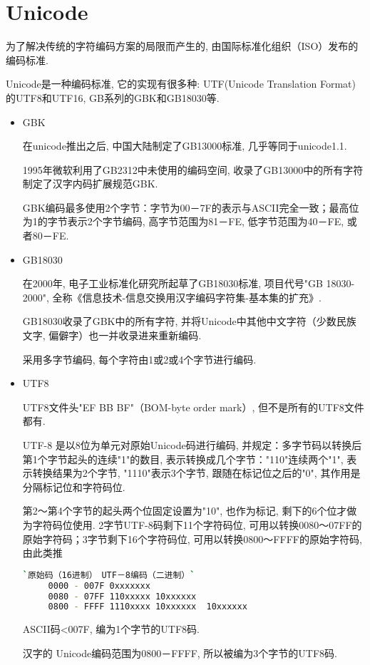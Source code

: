 \section*{\ZHH Unicode}{
    {为了解决传统的字符编码方案的局限而产生的, 由国际标准化组织（ISO）发布的编码标准. }\par
    {Unicode是一种编码标准, 它的实现有很多种: UTF(Unicode Translation Format)的UTF8和UTF16, GB系列的GBK和GB18030等. }\par
    \begin{itemize}
    \item{\ZHH \small GBK}\par{
        {在unicode推出之后, 中国大陆制定了GB13000标准, 几乎等同于unicode1.1.}\par
        {1995年微软利用了GB2312中未使用的编码空间, 收录了GB13000中的所有字符制定了汉字内码扩展规范GBK. }\par
        {GBK编码最多使用2个字节：字节为00－7F的表示与ASCII完全一致；最高位为1的字节表示2个字节编码, 高字节范围为81－FE, 低字节范围为40－FE, 或者80－FE.}\par
    }
    \item{\ZHH \small GB18030}\par{
        {在2000年, 电子工业标准化研究所起草了GB18030标准, 项目代号"GB 18030-2000", 全称《信息技术-信息交换用汉字编码字符集-基本集的扩充》.}\par
        {GB18030收录了GBK中的所有字符, 并将Unicode中其他中文字符（少数民族文字, 偏僻字）也一并收录进来重新编码. }\par
        {采用多字节编码, 每个字符由1或2或4个字节进行编码. }\par
    }
    \item{\ZHH \small UTF8}\par{
        {UTF8文件头"EF BB BF"（BOM-byte order mark）, 但不是所有的UTF8文件都有. }\par
        {UTF-8 是以8位为单元对原始Unicode码进行编码, 并规定：多字节码以转换后第1个字节起头的连续"1"的数目, 表示转换成几个字节："110"连续两个"1", 表示转换结果为2个字节, "1110"表示3个字节, 跟随在标记位之后的"0", 其作用是分隔标记位和字符码位. }\par
        {第2～第4个字节的起头两个位固定设置为"10", 也作为标记, 剩下的6个位才做为字符码位使用. 2字节UTF-8码剩下11个字符码位, 可用以转换0080～07FF的原始字符码；3字节剩下16个字符码位, 可用以转换0800～FFFF的原始字符码, 由此类推}\par
        \begin{lstlisting}[language=bash]
     `原始码（16进制）　UTF－8编码（二进制）`
     0000 - 007F 0xxxxxxx
     0080 - 07FF 110xxxxx 10xxxxxx
     0800 - FFFF 1110xxxx 10xxxxxx  10xxxxxx
        \end{lstlisting}
        {ASCII码<007F, 编为1个字节的UTF8码. }\par
        {汉字的 Unicode编码范围为0800－FFFF, 所以被编为3个字节的UTF8码. }\par

}
\end{itemize}}

